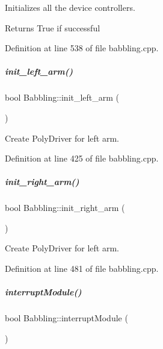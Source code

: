 Initializes all the device controllers. 

\begin{DoxyReturn}{Returns}
True if successful 
\end{DoxyReturn}


Definition at line 538 of file babbling.\+cpp.

\mbox{\label{group__babbling_a0ea0311715915eb771f8aecaec4b9839}} 
\subparagraph{\texorpdfstring{init\+\_\+left\+\_\+arm()}{init\_left\_arm()}}
{\footnotesize\ttfamily bool Babbling\+::init\+\_\+left\+\_\+arm (\begin{DoxyParamCaption}{ }\end{DoxyParamCaption})\hspace{0.3cm}{\ttfamily [protected]}}



Create Poly\+Driver for left arm. 



Definition at line 425 of file babbling.\+cpp.

\mbox{\label{group__babbling_a222fa43ddad0209a1b216ecc673f6bec}} 
\subparagraph{\texorpdfstring{init\+\_\+right\+\_\+arm()}{init\_right\_arm()}}
{\footnotesize\ttfamily bool Babbling\+::init\+\_\+right\+\_\+arm (\begin{DoxyParamCaption}{ }\end{DoxyParamCaption})\hspace{0.3cm}{\ttfamily [protected]}}



Create Poly\+Driver for left arm. 



Definition at line 481 of file babbling.\+cpp.

\mbox{\label{group__babbling_a1f29bf6caa9392f3f99af13df900b05f}} 
\subparagraph{\texorpdfstring{interrupt\+Module()}{interruptModule()}}
{\footnotesize\ttfamily bool Babbling\+::interrupt\+Module (\begin{DoxyParamCaption}{ }\end{DoxyParamCaption})}



